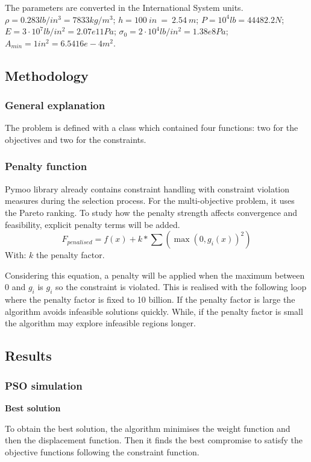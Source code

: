 The parameters are converted in the International System units.
$\rho=0.283lb/in^3=7833kg/m^3$;
$h=100\ in\ =\ 2.54\ m$;
$P={10}^4lb=44482.2N$;
$E=3\cdot{10}^7lb/in^2=2.07e11Pa$;
$\sigma_0=2\cdot{10}^4lb/in^2=1.38e8Pa$;
$A_{min}=1in^2=6.5416e-4m^2$.

\subsection{Methodology}

\subsubsection{General explanation}
The problem is defined with a class which contained four functions: two for the objectives and two for the constraints.

\subsubsection{Penalty function}
Pymoo library already contains constraint handling with constraint violation measures during the selection process. For the multi-objective problem, it uses the Pareto ranking. To study how the penalty strength affects convergence and feasibility, explicit penalty terms will be added.
\begin{equation}
F_{penalised}=f(x)+k\ast\sum\left(\max\left(0,g_i(x)\right)^2\right)
\end{equation}
With: $k$ the penalty factor.

Considering this equation, a penalty will be applied when the maximum between 0 and $g_i$ is $g_i$ so the constraint is violated. This is realised with the following loop where the penalty factor is fixed to 10 billion. If the penalty factor is large the algorithm avoids infeasible solutions quickly. While, if the penalty factor is small the algorithm may explore infeasible regions longer.

\subsection{Results}

\subsubsection{PSO simulation}

\textbf{Best solution}

To obtain the best solution, the algorithm minimises the weight function and then the displacement function. Then it finds the best compromise to satisfy the objective functions following the constraint function.

